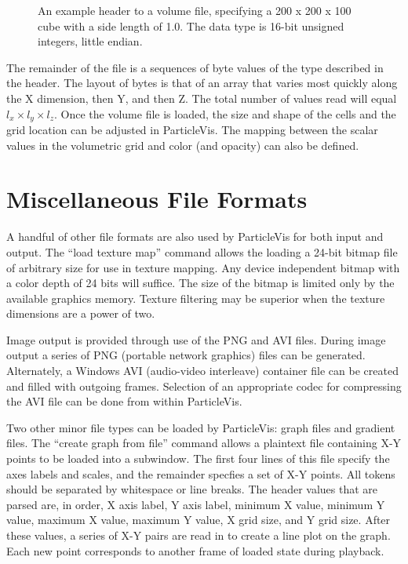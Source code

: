\begin{figure}[htb]
\centering
{}
\caption[An example header to a volume file]{An example header to a volume file, specifying a 200 x 200 x 100 cube with a side length of 1.0.  The data type is 16-bit unsigned integers, little endian.}
\label{example-header}
\end{figure}

The remainder of the file is a sequences of byte values of the type described in the header.  The layout of bytes is that of an array that varies most quickly along the X dimension, then Y, and then Z.  The total number of values read will equal $l_x \times l_y \times l_z$.  Once the volume file is loaded, the size and shape of the cells and the grid location can be adjusted in ParticleVis.  The mapping between the scalar values in the volumetric grid and color (and opacity) can also be defined.

\section{Miscellaneous File Formats}

A handful of other file formats are also used by ParticleVis for both input and output.  The ``load texture map'' command allows the loading a 24-bit bitmap file of arbitrary size for use in texture mapping.  Any device independent bitmap with a color depth of 24 bits will suffice.  The size of the bitmap is limited only by the available graphics memory.  Texture filtering may be superior when the texture dimensions are a power of two.

Image output is provided through use of the PNG and AVI files.  During image output a series of PNG (portable network graphics) files can be generated.  Alternately, a Windows AVI (audio-video interleave) container file can be created and filled with outgoing frames.  Selection of an appropriate codec for compressing the AVI file can be done from within ParticleVis.

Two other minor file types can be loaded by ParticleVis: graph files and gradient files.  The ``create graph from file'' command allows a plaintext file containing X-Y points to be loaded into a subwindow.  The first four lines of this file specify the axes labels and scales, and the remainder specfies a set of X-Y points.  All tokens should be separated by whitespace or line breaks.  The header values that are parsed are, in order, X axis label, Y axis label, minimum X value, minimum Y value, maximum X value, maximum Y value, X grid size, and Y grid size.  After these values, a series of X-Y pairs are read in to create a line plot on the graph.  Each new point corresponds to another frame of loaded state during playback.

